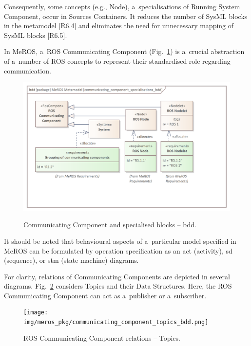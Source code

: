 \documentclass[11pt,oneside,a4paper]{report}
\begin{document}
	Consequently, some concepts (e.g., Node), a~specialisations of Running System Component, occur in Sources Containers. It reduces the number of SysML blocks in the metamodel [R6.4] and eliminates the need for unnecessary mapping of SysML blocks [R6.5].
		
	\pagebreak	
		
	In MeROS, a~ROS Communicating Component (Fig.~\ref{fig:communicating_components_bdd}) is a~crucial abstraction of a~number of ROS concepts to represent their standardised role regarding communication. 
	
		
	\begin{figure}[H]
		\centering
		\begin{center}
			{\includegraphics[scale=1.0]{img/meros_pkg/communicating_component_specialisations_bdd.png}}
		\end{center}
		\caption{Communicating Component and specialised blocks -- bdd.} 
		\label{fig:communicating_components_bdd}
	\end{figure}
	
	It should be noted that behavioural aspects of a~particular model specified in MeROS can be formulated by operation specification as an act (activity), sd (sequence), or stm (state machine) diagrams. 
	
	
	For clarity, relations of Communicating Components are depicted in several diagrams. Fig.~\ref{fig:communicating_component_topics_bdd} considers Topics and their Data Structures. Here, the ROS Communicating Component can act as a~publisher or a~subscriber.	
	 
	
	\begin{figure}[H]
		\centering
		\begin{center}
			{\texttt{[image: img/meros\_pkg/communicating\_component\_topics\_bdd.png]}}
		\end{center}
		\caption{ROS Communicating Component relations -- Topics.} 
		\label{fig:communicating_component_topics_bdd}
	\end{figure}
	
\end{document}
